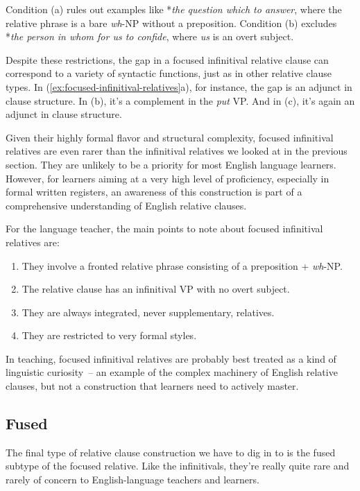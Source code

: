 Condition (a) rules out examples like *\textit{the question which to answer}, where the relative phrase is a bare \textit{wh}-NP without a preposition. Condition (b) excludes *\textit{the person in whom for us to confide}, where \textit{us} is an overt subject.

Despite these restrictions, the gap in a focused infinitival relative clause can correspond to a variety of syntactic functions, just as in other relative clause types. In (\ref{ex:focused-infinitival-relatives}a), for instance, the gap is an adjunct in clause structure. In (b), it's a complement in the \textit{put} VP. And in (c), it's again an adjunct in clause structure.

Given their highly formal flavor and structural complexity, focused infinitival relatives are even rarer than the infinitival relatives we looked at in the previous section. They are unlikely to be a priority for most English language learners. However, for learners aiming at a very high level of proficiency, especially in formal written registers, an awareness of this construction is part of a comprehensive understanding of English relative clauses.

For the language teacher, the main points to note about focused infinitival relatives are:

\begin{enumerate}[noitemsep]
    \item They involve a fronted relative phrase consisting of a preposition + \textit{wh}-NP.
    \item The relative clause has an infinitival VP with no overt subject.
    \item They are always integrated, never supplementary, relatives.
    \item They are restricted to very formal styles.
\end{enumerate}

In teaching, focused infinitival relatives are probably best treated as a kind of linguistic curiosity~--  an example of the complex machinery of English relative clauses, but not a construction that learners need to actively master.

\subsection{Fused}

The final type of relative clause construction we have to dig in to is the fused subtype of the focused relative. Like the infinitivals, they're really quite rare and rarely of concern to English-language teachers and learners.

